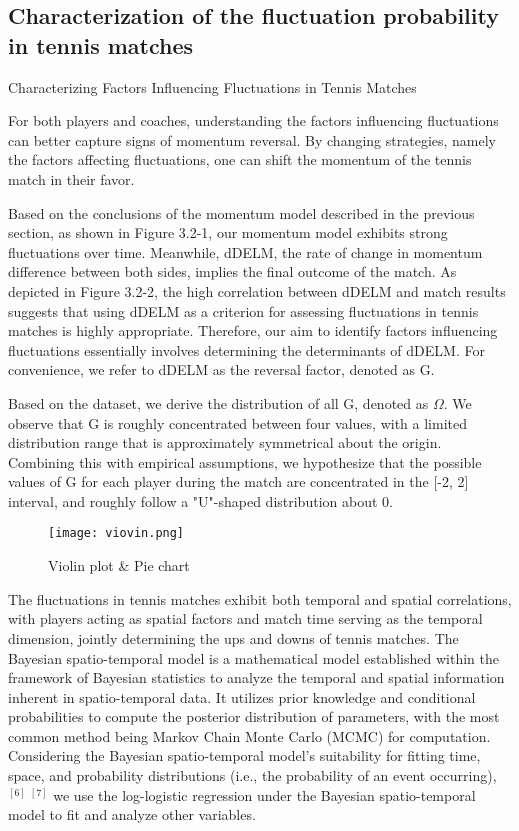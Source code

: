 \documentclass[12pt]{article}
\begin{document}
\subsection{Characterization of the fluctuation probability in tennis matches}

Characterizing Factors Influencing Fluctuations in Tennis Matches

For both players and coaches, understanding the factors influencing fluctuations can better capture signs of momentum reversal. By changing strategies, namely the factors affecting fluctuations, one can shift the momentum of the tennis match in their favor.

Based on the conclusions of the momentum model described in the previous section, as shown in Figure 3.2-1, our momentum model exhibits strong fluctuations over time. Meanwhile, dDELM, the rate of change in momentum difference between both sides, implies the final outcome of the match. As depicted in Figure 3.2-2, the high correlation between dDELM and match results suggests that using dDELM as a criterion for assessing fluctuations in tennis matches is highly appropriate. Therefore, our aim to identify factors influencing fluctuations essentially involves determining the determinants of dDELM. For convenience, we refer to dDELM as the reversal factor, denoted as G.

Based on the dataset, we derive the distribution of all G, denoted as $\Omega$. We observe that G is roughly concentrated between four values, with a limited distribution range that is approximately symmetrical about the origin. Combining this with empirical assumptions, we hypothesize that the possible values of G for each player during the match are concentrated in the [-2, 2] interval, and roughly follow a "U"-shaped distribution about 0.


\begin{figure}[H]
	\centering
	\texttt{[image: viovin.png]}
	\caption{Violin plot \& Pie chart}\label{fig:vica}
\end{figure}

The fluctuations in tennis matches exhibit both temporal and spatial correlations, with players acting as spatial factors and match time serving as the temporal dimension, jointly determining the ups and downs of tennis matches. The Bayesian spatio-temporal model is a mathematical model established within the framework of Bayesian statistics to analyze the temporal and spatial information inherent in spatio-temporal data. It utilizes prior knowledge and conditional probabilities to compute the posterior distribution of parameters, with the most common method being Markov Chain Monte Carlo (MCMC) for computation. Considering the Bayesian spatio-temporal model's suitability for fitting time, space, and probability distributions (i.e., the probability of an event occurring),$^{[6]}\ ^{[7]} $  we use the log-logistic regression under the Bayesian spatio-temporal model to fit and analyze other variables.
\end{document}
